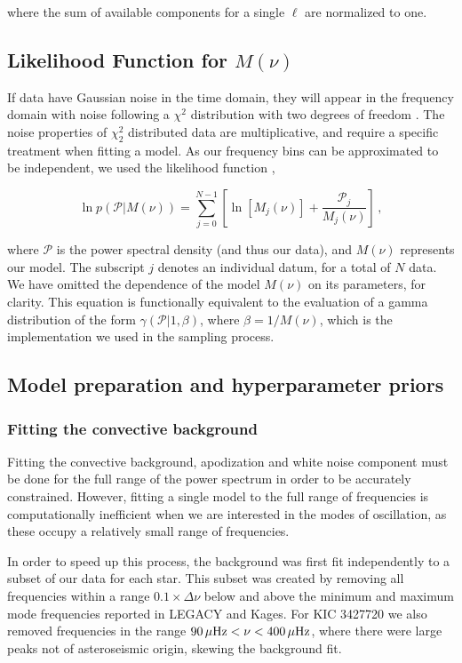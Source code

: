 \documentclass[12pt]{article}
\newcommand{\dnu}{\mbox{$\Delta \nu$}\xspace}
\begin{document}
\noindent where the sum of available components for a single $\ell$ are normalized to one.

\subsection{Likelihood Function for $M(\nu)$}\label{sec:like}
If data have Gaussian noise in the time domain, they will appear in the frequency domain with noise following a $\chi^2$ distribution with two degrees of freedom \cite[$\chi^2_2$ hereafter]{woodard1984}. The noise properties of $\chi^2_2$ distributed data are multiplicative, and require a specific treatment when fitting a model. As our frequency bins can be approximated to be independent, we used the likelihood function \cite{anderson+1990},

\begin{equation}
	\ln p(\mathcal{P} | M(\nu)) = \sum_{j=0}^{N-1} \left[\ln[M_j(\nu)] + \frac{\mathcal{P}_j}{M_j(\nu)}\right]\, , 
\end{equation}

\noindent where $\mathcal{P}$ is the power spectral density (and thus our data), and $M(\nu)$ represents our model. The subscript $j$ denotes an individual datum, for a total of $N$ data. We have omitted the dependence of the model $M(\nu)$ on its parameters, for clarity. This equation is functionally equivalent to the evaluation of a gamma distribution of the form $\gamma(\mathcal{P} | 1, \beta)$, where $\beta = 1/M(\nu)$, which is the implementation we used in the sampling process.

\subsection{Model preparation and hyperparameter priors}
\subsubsection{Fitting the convective background}\label{sec:background}
Fitting the convective background, apodization and white noise component must be done for the full range of the power spectrum in order to be accurately constrained. However, fitting a single model to the full range of frequencies is computationally inefficient when we are interested in the modes of oscillation, as these occupy a relatively small range of frequencies.

In order to speed up this process, the background was first fit independently to a subset of our data for each star. This subset was created by removing all frequencies within a range $0.1 \times \dnu$ below and above the minimum and maximum mode frequencies reported in LEGACY and Kages. For KIC 3427720 we also removed frequencies in the range $90\, \mu\rm{Hz} < \nu < 400\, \mu{\rm{Hz}}$, where there were large peaks not of asteroseismic origin, skewing the background fit.
\end{document}
